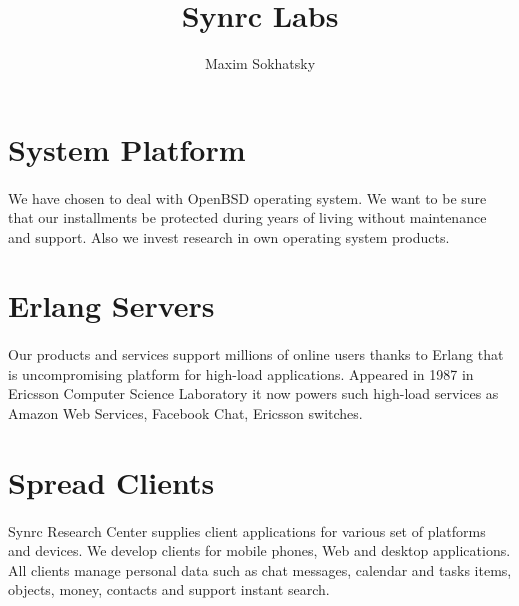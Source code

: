 \documentclass[11pt]{article}
\begin{document}

\title{Synrc Labs}
\author{Maxim Sokhatsky}


\section*{System Platform}
\paragraph{}
We have chosen to deal with OpenBSD operating system. We want to be sure that our
installments be protected during years of living without maintenance and support.
Also we invest research in own operating system products.


\section*{Erlang Servers}
\paragraph{}
Our products and services support millions of online users thanks to Erlang that
is uncompromising platform for high-load applications. Appeared in 1987 in Ericsson Computer
Science Laboratory it now powers such high-load services as Amazon Web Services, Facebook Chat, Ericsson switches.

\section*{Spread Clients}
\paragraph{}
Synrc Research Center supplies client applications for various set of platforms and devices.
We develop clients for mobile phones, Web and desktop applications. All clients manage personal data such as
chat messages, calendar and tasks items, objects, money, contacts and support instant search.
\end{document}
